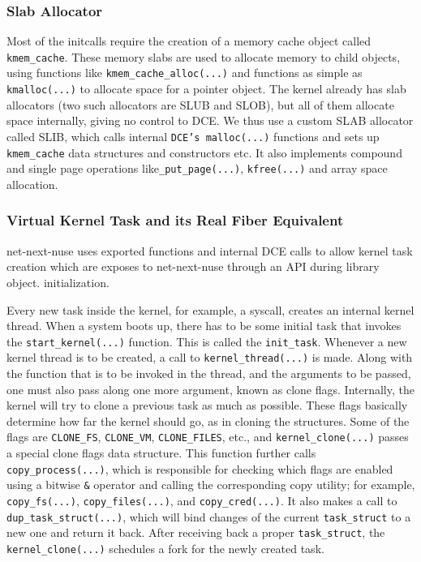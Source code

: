 \documentclass{sig-alternate}
\begin{document}
\subsubsection{Slab Allocator}
\sloppy Most of the initcalls require the creation of a memory cache object called \texttt{kmem\_cache}. These memory slabs are used to allocate memory to child 
objects, using functions like \texttt{kmem\_cache\_alloc(...)} and functions as simple as \texttt{kmalloc(...)} to allocate space for a pointer object. The 
kernel already has slab allocators (two such allocators are SLUB and SLOB), but all of them allocate space internally, giving no control to DCE. We thus use a custom 
SLAB allocator called SLIB, which calls internal \texttt{DCE's malloc(...)} functions and sets up \texttt{kmem\_cache} data structures and constructors etc. It also 
implements compound and single page operations like\texttt{\_put\_page(...)}, \texttt{kfree(...)} and array space allocation. 

\subsubsection{Virtual Kernel Task and its Real Fiber Equivalent}
net-next-nuse uses exported functions and internal DCE calls to allow kernel task creation  which are exposes to net-next-nuse through an API during library object.
initialization.

\sloppy Every new task inside the kernel, for example, a syscall, 
creates an internal kernel thread.  When a system boots up, there has to be some initial task that invokes the \texttt{start\_kernel(...)} 
function. This is called the \texttt{init\_task}. Whenever a new kernel thread is to be created, a call to \texttt{kernel\_thread(...)} is made. Along with the 
function that is to be invoked in the thread, and the arguments to be passed, one must also pass along one more argument, known as clone flags. 
Internally, the kernel will try to clone a previous task as much as possible. These flags basically determine 
how far the kernel should go, as in cloning the structures. Some of the flags are \texttt{CLONE\_FS}, \texttt{CLONE\_VM}, \texttt{CLONE\_FILES}, etc., 
and \texttt{kernel\_clone(...)} passes a special clone flags data structure. This function further calls \texttt{copy\_process(...)}, which is responsible for checking 
which flags are enabled using a bitwise \texttt{\&} operator and calling the corresponding copy utility; for example, \texttt{copy\_fs(...)}, \texttt{copy\_files(...)}, 
and \texttt{copy\_cred(...)}.  It also makes a call to \texttt{dup\_task\_struct(...)}, which will bind changes of the current \texttt{task\_struct} to a new one and 
return it back. After receiving back a proper \texttt{task\_struct}, the \texttt{kernel\_clone(...)} schedules a fork for the newly created task.
\end{document}
